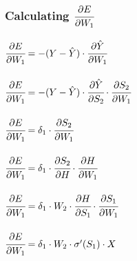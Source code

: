 \documentclass{article}
\begin{document}
\subsubsection{Calculating $\cfrac{\partial E}{\partial W_1}$}
$\cfrac{\partial E}{\partial W_1} = -(Y- \hat{Y})\cdot
\cfrac{\partial \hat{Y}}{\partial W_1}$\\
\\$\cfrac{\partial E}{\partial W_1} = -(Y- \hat{Y})\cdot
\cfrac{\partial \hat{Y}}{\partial S_2} \cdot \cfrac{\partial S_2}{\partial W_1}$\\
\\$\cfrac{\partial E}{\partial W_1} = \delta_1 \cdot \cfrac{\partial S_2}{\partial W_1}$\\
\\$\cfrac{\partial E}{\partial W_1} = \delta_1 \cdot \cfrac{\partial S_2}{\partial H} \cdot \cfrac{\partial H}{\partial W_1}$\\
\\$\cfrac{\partial E}{\partial W_1} = \delta_1 \cdot W_2 \cdot
\cfrac{\partial H}{\partial S_1} \cdot \cfrac{\partial S_1}{\partial W_1}$\\
\\$\cfrac{\partial E}{\partial W_1} = \delta_1 \cdot W_2 \cdot
\sigma^\prime(S_1) \cdot X$\\
\end{document}
